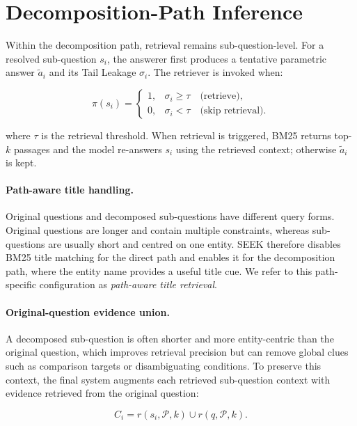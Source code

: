 \section{Decomposition-Path Inference}
\label{sec:gate}

Within the decomposition path, retrieval remains sub-question-level. For a resolved sub-question $s_i$, the answerer first produces a tentative parametric answer $\tilde{a}_i$ and its Tail Leakage $\sigma_i$. The retriever is invoked when:

\begin{equation}
    \pi(s_i)=
    \begin{cases}
        1, & \sigma_i \geq \tau \quad \text{(retrieve)}, \\
        0, & \sigma_i < \tau \quad \text{(skip retrieval)}.
    \end{cases}
    \label{eq:retrieval-gate}
\end{equation}

where $\tau$ is the retrieval threshold. When retrieval is triggered, BM25 returns top-$k$ passages and the model re-answers $s_i$ using the retrieved context; otherwise $\tilde{a}_i$ is kept.

\paragraph{Path-aware title handling.}
Original questions and decomposed sub-questions have different query forms. Original questions are longer and contain multiple constraints, whereas sub-questions are usually short and centred on one entity. SEEK therefore disables BM25 title matching for the direct path and enables it for the decomposition path, where the entity name provides a useful title cue. We refer to this path-specific configuration as \emph{path-aware title retrieval}.

\paragraph{Original-question evidence union.}
A decomposed sub-question is often shorter and more entity-centric than the original question, which improves retrieval precision but can remove global clues such as comparison targets or disambiguating conditions. To preserve this context, the final system augments each retrieved sub-question context with evidence retrieved from the original question:

\begin{equation}
    C_i = r(s_i, \mathcal{P}, k) \cup r(q, \mathcal{P}, k).
    \label{eq:evidence-union}
\end{equation}

